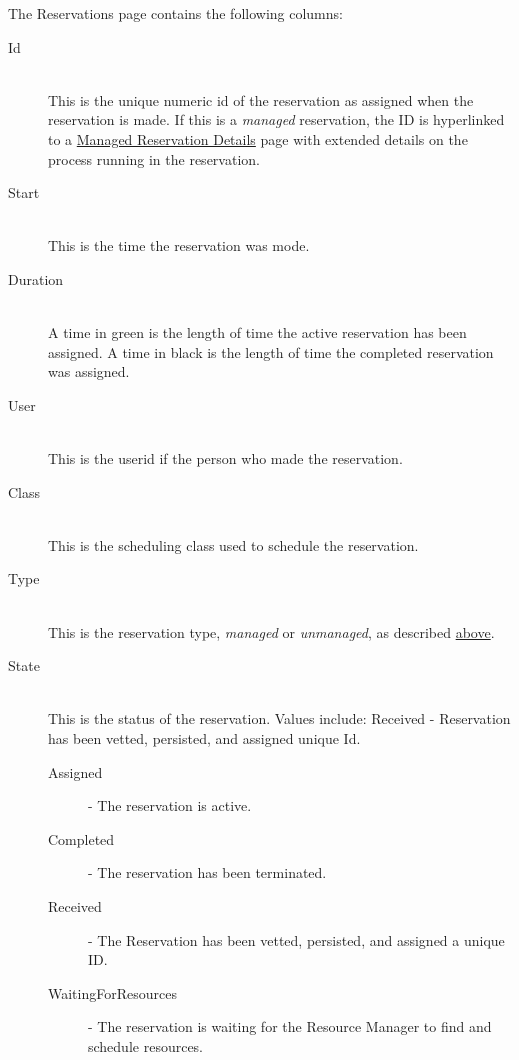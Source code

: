 The Reservations page contains the following columns: 
\begin{description}

\item[Id] \hfill \\
  This is the unique {\DUCC} numeric id of the reservation as assigned when the reservation is made.
  If this is a {\em managed} reservation, the ID is hyperlinked to a
  \hyperref[sec:ws-managed-reservation-details]{Managed Reservation Details} page with extended
  details on the process running in the reservation.

\item[Start] \hfill \\
  This is the time the reservation was mode.
  
\item[Duration] \hfill \\
  A time in green is the length of time the active reservation has been assigned.  
  A time in black is the length of time the completed reservation was assigned. 
  
\item[User] \hfill \\
  This is the userid if the person who made the reservation.
  
\item[Class] \hfill \\
  This is the scheduling class used to schedule the reservation.
  
\item[Type] \hfill \\
  This is the reservation type, {\em managed} or {\em unmanaged}, as described 
  \hyperref[sec:ws-reservations]{above}.

\item[State] \hfill \\
  This is the status of the reservation. Values include: Received - Reservation
  has been vetted, persisted, and assigned unique Id.
  \begin{description}
  \item[Assigned] - The reservation is active. 
  \item[Completed] - The reservation has been terminated.
  \item[Received] - The Reservation has been vetted, persisted, and assigned a unique ID.
  \item[WaitingForResources] - The reservation is waiting for the Resource Manager to find and 
    schedule resources. 
  \end{description}


\end{description}
